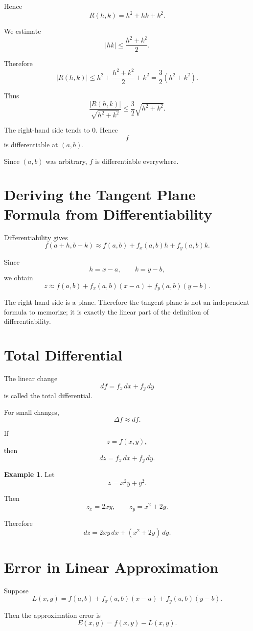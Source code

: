 \documentclass[11pt,oneside]{book}
\theoremstyle{studentthm}
\theoremstyle{definition}
\newtheorem{example}[theorem]{Example}
\begin{document}
Hence
\[
R(h,k)=h^2+hk+k^2.
\]

We estimate
\[
|hk|
\le
\frac{h^2+k^2}{2}.
\]

Therefore
\[
|R(h,k)|
\le
h^2+\frac{h^2+k^2}{2}+k^2
=
\frac32(h^2+k^2).
\]

Thus
\[
\frac{|R(h,k)|}{\sqrt{h^2+k^2}}
\le
\frac32\sqrt{h^2+k^2}.
\]

The right-hand side tends to \(0\). Hence
\[
f
\]
is differentiable at \((a,b)\).

Since \((a,b)\) was arbitrary, \(f\) is differentiable everywhere.

\section{Deriving the Tangent Plane Formula from Differentiability}

Differentiability gives
\[
f(a+h,b+k)
\approx
f(a,b)
+
f_x(a,b)h
+
f_y(a,b)k.
\]

Since
\[
h=x-a,
\qquad
k=y-b,
\]
we obtain
\[
z
\approx
f(a,b)
+
f_x(a,b)(x-a)
+
f_y(a,b)(y-b).
\]

The right-hand side is a plane. Therefore the tangent plane is not an
independent formula to memorize; it is exactly the linear part of the
definition of differentiability.

\section{Total Differential}

The linear change
\[
df
=
f_x\,dx+f_y\,dy
\]
is called the total differential.

For small changes,
\[
\Delta f
\approx df.
\]

If
\[
z=f(x,y),
\]
then
\[
dz=f_x\,dx+f_y\,dy.
\]

\begin{example}
Let
\[
z=x^2y+y^2.
\]

Then
\[
z_x=2xy,
\qquad
z_y=x^2+2y.
\]

Therefore
\[
dz
=
2xy\,dx
+
(x^2+2y)\,dy.
\]
\end{example}

\section{Error in Linear Approximation}

Suppose
\[
L(x,y)
=
f(a,b)
+
f_x(a,b)(x-a)
+
f_y(a,b)(y-b).
\]

Then the approximation error is
\[
E(x,y)=f(x,y)-L(x,y).
\]
\end{document}
